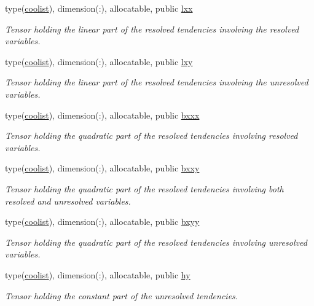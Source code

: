 \begin{DoxyCompactItemize}
type(\hyperlink{structtensor_1_1coolist}{coolist}), dimension(\+:), allocatable, public \hyperlink{namespacedec__tensor_a9a9feb72e769222453930a8e4a5fdea3}{lxx}
\begin{DoxyCompactList}\small\item\em Tensor holding the linear part of the resolved tendencies involving the resolved variables. \end{DoxyCompactList}\item 
type(\hyperlink{structtensor_1_1coolist}{coolist}), dimension(\+:), allocatable, public \hyperlink{namespacedec__tensor_a994871cb59cfc0743f3d2a22aa81abc4}{lxy}
\begin{DoxyCompactList}\small\item\em Tensor holding the linear part of the resolved tendencies involving the unresolved variables. \end{DoxyCompactList}\item 
type(\hyperlink{structtensor_1_1coolist}{coolist}), dimension(\+:), allocatable, public \hyperlink{namespacedec__tensor_ad4649ed646f1d4cdb0997880e4f39969}{bxxx}
\begin{DoxyCompactList}\small\item\em Tensor holding the quadratic part of the resolved tendencies involving resolved variables. \end{DoxyCompactList}\item 
type(\hyperlink{structtensor_1_1coolist}{coolist}), dimension(\+:), allocatable, public \hyperlink{namespacedec__tensor_ad451ae880f34cc385482e33b45070dcd}{bxxy}
\begin{DoxyCompactList}\small\item\em Tensor holding the quadratic part of the resolved tendencies involving both resolved and unresolved variables. \end{DoxyCompactList}\item 
type(\hyperlink{structtensor_1_1coolist}{coolist}), dimension(\+:), allocatable, public \hyperlink{namespacedec__tensor_aa11fd10e3419deddd481098f4a2d2949}{bxyy}
\begin{DoxyCompactList}\small\item\em Tensor holding the quadratic part of the resolved tendencies involving unresolved variables. \end{DoxyCompactList}\item 
type(\hyperlink{structtensor_1_1coolist}{coolist}), dimension(\+:), allocatable, public \hyperlink{namespacedec__tensor_a9c51afb9b52f76670bcb3496d32fabf3}{hy}
\begin{DoxyCompactList}\small\item\em Tensor holding the constant part of the unresolved tendencies. \end{DoxyCompactList}\item 

\end{DoxyCompactItemize}
